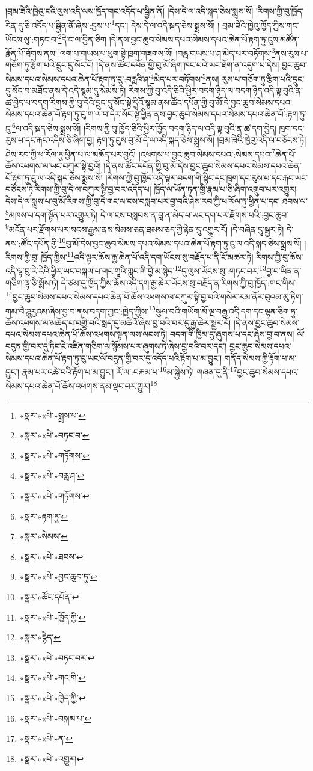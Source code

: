 །བྲམ་ཟེའི་ཁྱེའུ་ངའི་ལུས་འདི་ལས་ཁྱོད་གང་འདོད་པ་སྦྱིན་ནོ། །དེས་དེ་ལ་འདི་སྐད་ཅེས་སྨྲས་སོ། །རིགས་ཀྱི་བུ་ཁྱོད་རིན་དུ་ཅི་འདོད་པ་སྦྱིན་ནོ་ཞེས་:བྱས་པ་\footnote{«སྣར་»«པེ་»སྨྲས་པ་}དང་། དེས་དེ་ལ་འདི་སྐད་ཅེས་སྨྲས་སོ། །
བྲམ་ཟེའི་ཁྱེའུ་ཁྱོད་ཀྱིས་གང་ཡོངས་སུ་:གཏང་བ་\footnote{«སྣར་»«པེ་»བཏང་བ་}དེ་ང་ལ་བྱིན་ཅིག །དེ་ནས་བྱང་ཆུབ་སེམས་དཔའ་སེམས་དཔའ་ཆེན་པོ་རྟག་ཏུ་ངུས་མཚོན་རྣོན་པོ་ཐོགས་ནས། ལག་པ་གཡས་པ་ཕུག་སྟེ་ཁྲག་གཟགས་སོ། །བརླ་གཡས་པ་ཤ་མེད་པར་བཏོགས་\footnote{«སྣར་»«པེ་»གཏོགས་}ནས་རུས་པ་གཅོག་ཏུ་རྩིག་པའི་དྲུང་དུ་སོང་ངོ། །དེ་ནས་ཚོང་དཔོན་གྱི་བུ་མོ་ཞིག་ཁང་པའི་ཡང་ཐོག་ན་འདུག་པ་དེས། བྱང་ཆུབ་སེམས་དཔའ་སེམས་དཔའ་ཆེན་པོ་རྟག་ཏུ་ངུ་:བརླའི་ཤ་\footnote{«སྣར་»«པེ་»བརླ་ཤ་}མེད་པར་བཏོགས་\footnote{«སྣར་»«པེ་»གཏོགས་}ནས། རུས་པ་གཅོག་ཏུ་རྩིག་པའི་དྲུང་དུ་སོང་བ་མཐོང་ནས་དེ་འདི་སྙམ་དུ་སེམས་ཏེ། རིགས་ཀྱི་བུ་འདི་ཅིའི་ཕྱིར་བདག་ཉིད་ལ་བདག་ཉིད་འདི་ལྟ་བུའི་ན་ཚ་བྱེད་པ་བདག་རིགས་ཀྱི་བུ་དེའི་དྲུང་དུ་སོང་སྟེ་དྲིའོ་སྙམ་ནས་ཚོང་དཔོན་གྱི་བུ་མོ་དེ་བྱང་ཆུབ་སེམས་དཔའ་སེམས་དཔའ་ཆེན་པོ་རྟག་ཏུ་ངུ་ག་ལ་བ་དེར་སོང་སྟེ་ཕྱིན་ནས་བྱང་ཆུབ་སེམས་དཔའ་སེམས་དཔའ་ཆེན་པོ་:རྟག་ཏུ་ངུ་\footnote{«སྣར་»རྟག་ཏུ་}ལ་འདི་སྐད་ཅེས་སྨྲས་སོ། །རིགས་ཀྱི་བུ་ཁྱོད་ཅིའི་ཕྱིར་ཁྱོད་བདག་ཉིད་ལ་འདི་ལྟ་བུའི་ན་ཚ་དག་བྱེད། ཁྲག་དང་རུས་པ་དང་རྐང་འདིས་ཅི་ཞིག་བྱ། རྟག་ཏུ་ངུས་བུ་མོ་དེ་ལ་འདི་སྐད་ཅེས་སྨྲས་སོ། །བྲམ་ཟེའི་ཁྱེའུ་འདི་ལ་བཅོངས་ཏེ། ཤེས་རབ་ཀྱི་ཕ་རོལ་ཏུ་ཕྱིན་པ་ལ་མཆོད་པར་བྱའོ། །འཕགས་པ་བྱང་ཆུབ་སེམས་དཔའ་:སེམས་དཔའ་\footnote{«སྣར་»སེམས་}ཆེན་པོ་ཆོས་འཕགས་ལ་ཡང་བཀུར་སྟི་བྱའོ། །དེ་ནས་ཚོང་དཔོན་གྱི་བུ་མོ་དེས་བྱང་ཆུབ་སེམས་དཔའ་སེམས་དཔའ་ཆེན་པོ་རྟག་ཏུ་ངུ་ལ་འདི་སྐད་ཅེས་སྨྲས་སོ། །རིགས་ཀྱི་བུ་ཁྱོད་འདི་ལྟར་བདག་གི་སྙིང་དང་ཁྲག་དང་རུས་པ་དང་རྐང་ཡང་བཙོངས་ཏེ་རིགས་ཀྱི་བུ་དེ་ལ་བཀུར་སྟི་བྱ་བར་འདོད་པ། ཁྱོད་ལ་ཡོན་ཏན་གྱི་རྣམ་པ་ཅི་ཞིག་འགྲུབ་པར་འགྱུར། དེས་དེ་ལ་སྨྲས་པ་བུ་མོ་རིགས་ཀྱི་བུ་དེ་གང་ལ་ངས་བསླབ་པར་བྱ་བའི་ཤེས་རབ་ཀྱི་ཕ་རོལ་ཏུ་ཕྱིན་པ་དང་:ཐབས་ལ་\footnote{«སྣར་»«པེ་»ཐབས་}མཁས་པ་དག་སྟོན་པར་འགྱུར་ཏེ། དེ་ལ་ངས་བསླབས་ན་བླ་ན་མེད་པ་ཡང་དག་པར་རྫོགས་པའི་:བྱང་ཆུབ་\footnote{«སྣར་»«པེ་»བྱང་ཆུབ་ཏུ་}མངོན་པར་རྫོགས་པར་སངས་རྒྱས་ནས་སེམས་ཅན་ཐམས་ཅད་ཀྱི་རྟེན་དུ་འགྱུར་རོ། །དེ་བཞིན་དུ་སྦྱར་ཏེ། དེ་ནས་:ཚོང་དཔོན་གྱི་\footnote{«སྣར་»ཚོང་དཔོན་}བུ་མོ་དེས་བྱང་ཆུབ་སེམས་དཔའ་སེམས་དཔའ་ཆེན་པོ་རྟག་ཏུ་ངུ་ལ་འདི་སྐད་ཅེས་སྨྲས་སོ། །རིགས་ཀྱི་བུ་:ཁྱོད་ཀྱིས་\footnote{«སྣར་»«པེ་»ཁྱོད་ཀྱི་}འདི་ལྟར་ཆོས་རྒྱ་ཆེན་པོ་འདི་དག་ཡོངས་སུ་བརྗོད་པ་ནི་ངོ་མཚར་ཏེ། རིགས་ཀྱི་བུ་ཆོས་འདི་ལྟ་བུ་རེ་རེའི་ཕྱིར་ཡང་བསྐལ་པ་གང་གཱའི་ཀླུང་གི་བྱེ་མ་སྙེད་\footnote{«སྣར་»རྙེད་}དུ་ལུས་ཡོངས་སུ་:གཏང་བར་\footnote{«སྣར་»«པེ་»བཏང་བར་}བྱ་བ་ཡིན་ན་གཅིག་ལྟ་ཅི་སྨོས་ཏེ། དེ་ཙམ་དུ་ཁྱོད་ཀྱིས་ཆོས་འདི་དག་རྒྱ་ཆེར་ཡོངས་སུ་བརྗོད་ན་རིགས་ཀྱི་བུ་ཁྱོད་:གང་གིས་\footnote{«སྣར་»«པེ་»གང་གི་}བྱང་ཆུབ་སེམས་དཔའ་སེམས་དཔའ་ཆེན་པོ་ཆོས་འཕགས་ལ་བཀུར་སྟི་བྱ་བའི་གསེར་རམ་ནོར་བུའམ་མུ་ཏིག་གམ་བཻ་ཌཱུརྱའམ་ཞེས་བྱ་བ་ནས་བདག་ཀྱང་:ཁྱེད་ཀྱིས་\footnote{«སྣར་»«པེ་»ཁྱེད་ཀྱི་}སྩལ་བའི་གཡོག་མོ་ལྔ་བརྒྱ་འདི་དག་དང་ལྷན་ཅིག་ཏུ་ཆོས་འཕགས་ལ་མཆོད་པ་བགྱི་བའི་སླད་དུ་མཆིའོ་ཞེས་བྱ་བའི་བར་དུ་རྒྱ་ཆེར་སྦྱར་རོ། །དེ་ནས་བྱང་ཆུབ་སེམས་དཔའ་སེམས་དཔའ་ཆེན་པོ་ཆོས་འཕགས་སྟན་ལས་ལངས་ཏེ། བདག་གི་ཁྱིམ་དུ་ཞུགས་པ་དང་ཞེས་བྱ་བ་ནས། ལོ་བདུན་གྱི་བར་དུ་ཏིང་ངེ་འཛིན་གཅིག་ལ་སྙོམས་པར་ཞུགས་ཏེ་ཞེས་བྱ་བའི་བར་དང་། བྱང་ཆུབ་སེམས་དཔའ་སེམས་དཔའ་ཆེན་པོ་རྟག་ཏུ་ངུ་ཡང་ལོ་བདུན་གྱི་བར་དུ་འདོད་པའི་རྟོག་པ་མ་བྱུང་། གནོད་སེམས་ཀྱི་རྟོག་པ་མ་བྱུང་། རྣམ་པར་འཚེ་བའི་རྟོག་པ་མ་བྱུང་། རོ་ལ་:བརྐམ་པ་\footnote{«སྣར་»«པེ་»བསྐམ་པ་}མ་སྐྱེས་ཏེ། གཞན་དུ་ནི་\footnote{«སྣར་»«པེ་»ན་}བྱང་ཆུབ་སེམས་དཔའ་སེམས་དཔའ་ཆེན་པོ་ཆོས་འཕགས་ནམ་ལྡང་བར་གྱུར།\footnote{«སྣར་»«པེ་»འགྱུར།} 